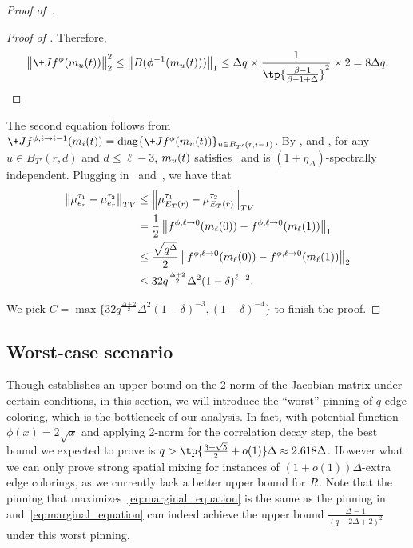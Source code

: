 \begin{proof}[Proof of~]
\begin{proof}[Proof of ]
    Therefore, 
    $$
        \norm{\+J f^\phi(\*m_u(t))}_2^2 \leq \norm{\*B(\phi^{-1}(\*m_u(t)))}_1
        \leq \Delta q\times \frac{1}{\tp{\frac{\beta -1}{\beta -1 + \Delta}}^2}\times 2
        = 8 \Delta q.
    $$
\end{proof}
The second equation follows from $\+J f^{\phi,i\ra i-1}(\*m_i(t)) = \operatorname{diag}\{\+J f^{\phi}(\*m_u(t))\}_{u\in B_{T'}(r,i-1)}$.
By ,  and , for any $u\in B_{T'}(r,d)$ and $d\leq \ell-3$, $\*m_u(t)$ satisfies~ and is $(1+\eta_\Delta)$-spectrally independent.
Plugging in~ and~, we have that 
\begin{align*}
     \norm{\mu_{e_r}^{\tau_1}- \mu_{e_r}^{\tau_2}}_{\-{TV}}
    &\leq \norm{\mu_{E_T(r)}^{\tau_1}- \mu_{E_T(r)}^{\tau_2}}_{\-{TV}}
    \\&= \frac 12\norm{f^{\phi,\ell\ra 0}(\*m_\ell(0)) - f^{\phi,\ell\ra 0}(\*m_\ell(1))}_1
    \\&\leq \frac{\sqrt{q^\Delta}}2\norm{f^{\phi,\ell\ra 0}(\*m_\ell(0)) - f^{\phi,\ell\ra 0}(\*m_\ell(1))}_2
    \\&\leq 32q^{\frac{\Delta + 2}2}\Delta^2(1-\delta)^{\ell-2}.
\end{align*}

We pick $C = \max\{32q^{\frac{\Delta + 2}2}\Delta^2(1-\delta)^{-3},(1-\delta)^{-4}\}$ to finish the proof.
\end{proof}

\subsection{Worst-case scenario}\label{sec:limit}

Though  establishes an upper bound on the 2-norm of the Jacobian matrix under certain conditions, in this section, we will introduce the ``worst'' pinning of $q$-edge coloring, which is the bottleneck of our analysis. 
In fact, with potential function $\phi(x) = 2\sqrt x$ and applying 2-norm for the correlation decay step, the best bound we expected to prove is $q > \tp{\frac{3+\sqrt 5}{2}+ o(1)}\Delta\approx 2.618\Delta$. However what we can only prove strong spatial mixing for instances of $(1+o(1))\Delta$-extra edge colorings, as we currently lack a better upper bound for $\*R$.
Note that the pinning that maximizes~\cref{eq:marginal_equation} is the same as the pinning in~ and~\cref{eq:marginal_equation} can indeed achieve the upper bound $\frac{\Delta-1}{(q-2\Delta+2)^2}$ under this worst pinning.

